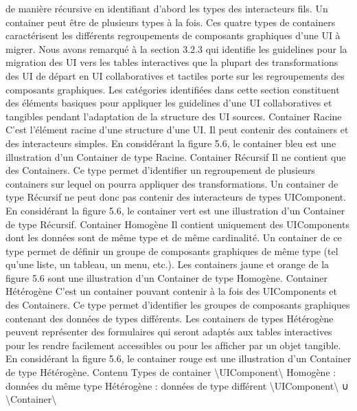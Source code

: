 \documentclass{article}
\begin{document}
de mani\`{e}re r\'{e}cursive en identiﬁant d’abord les types des interacteurs ﬁls. Un container peut \^{e}tre de
plusieurs types \`{a} la fois.
Ces quatre types de containers caract\'{e}risent les diff\'{e}rents regroupements de composants graphiques d’une UI \`{a} migrer. Nous avons remarqu\'{e} \`{a} la section 3.2.3 qui identiﬁe les guidelines pour
la migration des UI vers les tables interactives que la plupart des transformations des UI de d\'{e}part en
UI collaboratives et tactiles porte sur les regroupements des composants graphiques. Les cat\'{e}gories
identiﬁ\'{e}es dans cette section constituent des \'{e}l\'{e}ments basiques pour appliquer les guidelines d’une UI
collaboratives et tangibles pendant l’adaptation de la structure des UI sources.
Container Racine
C’est l’\'{e}l\'{e}ment racine d’une structure d’une UI. Il peut contenir des containers
et des interacteurs simples. En consid\'{e}rant la ﬁgure 5.6, le container bleu est une illustration d’un
Container de type Racine.
Container R\'{e}cursif
Il ne contient que des Containers. Ce type permet d’identiﬁer un regroupement
de plusieurs containers sur lequel on pourra appliquer des transformations. Un container de type R\'{e}cursif ne peut donc pas contenir des interacteurs de types UIComponent. En consid\'{e}rant la ﬁgure 5.6,
le container vert est une illustration d’un Container de type R\'{e}cursif.
Container Homog\`{e}ne
Il contient uniquement des UIComponents dont les donn\'{e}es sont de m\^{e}me
type et de m\^{e}me cardinalit\'{e}. Un container de ce type permet de d\'{e}ﬁnir un groupe de composants
graphiques de m\^{e}me type (tel qu’une liste, un tableau, un menu, etc.). Les containers jaune et orange
de la ﬁgure 5.6 sont une illustration d’un Container de type Homog\`{e}ne.
Container H\'{e}t\'{e}rog\`{e}ne
C’est un container pouvant contenir \`{a} la fois des UIComponents et des
Containers. Ce type permet d’identiﬁer les groupes de composants graphiques contenant des donn\'{e}es de types diff\'{e}rents. Les containers de types H\'{e}t\'{e}rog\`{e}ne peuvent repr\'{e}senter des formulaires qui
seront adapt\'{e}s aux tables interactives pour les rendre facilement accessibles ou pour les afﬁcher par
un objet tangible. En consid\'{e}rant la ﬁgure 5.6, le container rouge est une illustration d’un Container
de type H\'{e}t\'{e}rog\`{e}ne.
Contenu
Types de container
\textbackslash{}{UIComponent\textbackslash{}}
Homog\`{e}ne : donn\'{e}es du m\^{e}me type
H\'{e}t\'{e}rog\`{e}ne : donn\'{e}es de type diff\'{e}rent
\textbackslash{}{UIComponent\textbackslash{}}
∪
\textbackslash{}{Container\textbackslash{}}
\end{document}

